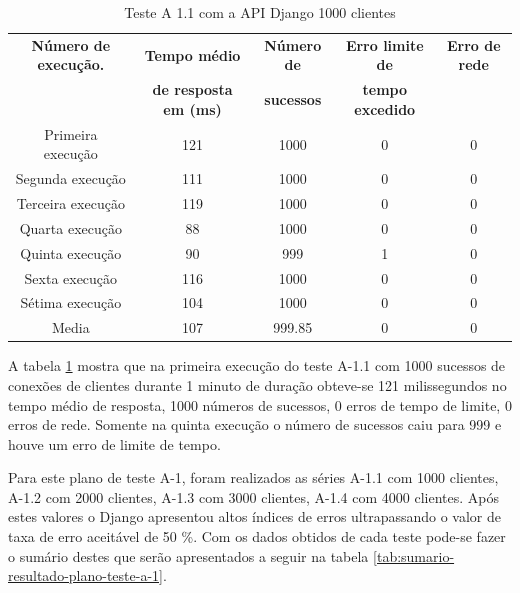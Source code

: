   \begin{table}[H]
    \centering
    \footnotesize
    \setlength{\abovecaptionskip}{0pt}
    \setlength{\belowcaptionskip}{0pt}
    \caption[Teste A-1.1 com a API Django 1000 clientes]{Teste A 1.1 com a API Django 1000 clientes}
    \label{tab:teste-a-1-1}
    \begin{tabular}{c|c|c|c|c}
      \hline \hline
      \textbf{Número de execução.} & \textbf{Tempo médio } &	\textbf{Número de } & \textbf{Erro limite de} & \textbf{Erro de rede}  \\
	    {}			   & \textbf{de resposta em (ms) } &\textbf{sucessos } & \textbf{tempo excedido} & {}  \\
      \hline \hline
      Primeira execução &		121 &				1000 &			0 &			0 \\
      Segunda execução &		111 &				1000 &			0 &			0 \\
      Terceira execução &		119 &				1000 &			0 &			0 \\
      Quarta execução  &		88 &				1000 &			0 &			0 \\
      Quinta execução  &		90 &				999 &			1 &			0 \\
      Sexta execução   &		116 &				1000 &			0 &			0 \\
      Sétima execução  &		104 &				1000 &			0 &			0 \\
      Media & 				107 &				999.85 & 		0 &			0 \\
      \hline \hline
    \end{tabular}
  \end{table}

  A tabela \ref{tab:teste-a-1-1} mostra que na primeira execução do teste A-1.1 com 1000 sucessos de conexões de clientes
  durante 1 minuto de duração obteve-se 121 milissegundos no tempo médio de resposta,
  1000 números de sucessos, 0 erros de tempo de limite, 0 erros de rede. Somente na quinta execução o número de sucessos
  caiu para 999 e houve um erro de limite de tempo.

  Para este plano de teste A-1, foram realizados as séries A-1.1 com 1000 clientes, A-1.2 com 2000 clientes, A-1.3 com 3000 clientes,
  A-1.4 com 4000 clientes. Após estes valores o Django apresentou altos índices de erros ultrapassando o valor de taxa de erro
  aceitável de 50 \%. Com os dados obtidos de cada teste pode-se fazer o sumário
  destes que serão apresentados a seguir na tabela \ref{tab:sumario-resultado-plano-teste-a-1}.


